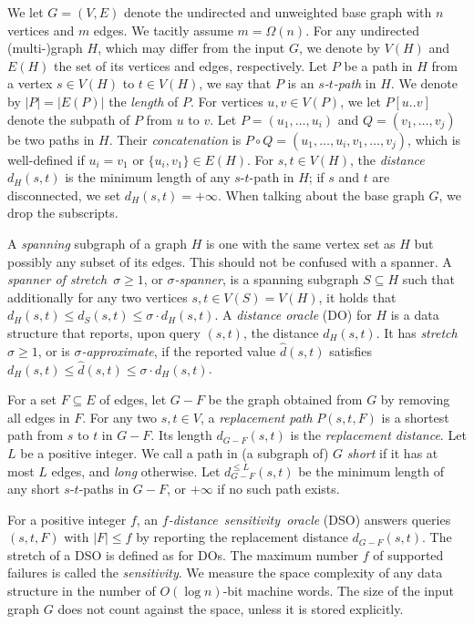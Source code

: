 \documentclass{theoretics}
\renewcommand{\le}{\leqslant}
\renewcommand{\ge}{\geqslant}
\begin{document}
We let $G = (V,E)$ denote the undirected and unweighted base graph with $n$ vertices and $m$ edges.
We tacitly assume $m = \Omega(n)$.
For any undirected \mbox{(multi-)graph} $H$, which may differ from the input $G$,
we denote by $V(H)$ and $E(H)$ the set of its vertices and edges, respectively.
Let $P$ be a path in $H$ from a vertex $s \in V(H)$ to $t \in V(H)$,
we say that $P$ is an \emph{$s$-$t$-path} in $H$. 
We denote by $|P| = |E(P)|$ the \emph{length} of $P$.
For vertices $u,v \in V(P)$, we let $P[u..v]$ denote the subpath of $P$ from $u$ to $v$.
Let $P = (u_1, \dots, u_i)$ and $Q = (v_1, \dots, v_j)$ be two paths in $H$.
Their \emph{concatenation} is $P \circ Q = (u_1, \dots, u_i, v_1, \dots, v_j)$,
which is well-defined if $u_i = v_1$ or $\{u_i,v_1\} \in E(H)$.
For $s,t \in V(H)$, the \emph{distance} $d_H(s,t)$ 
is the minimum length of any $s$-$t$-path in $H$;
if $s$ and $t$ are disconnected, we set $d_H(s,t) =+ \infty$.
When talking about the base graph $G$, we drop the subscripts.

A \emph{spanning} subgraph of a graph $H$
is one with the same vertex set as $H$ but possibly any subset of its edges.
This should not be confused with a spanner.
A \emph{spanner of stretch}~$\sigma \ge 1$, or \emph{$\sigma$-spanner},
is a spanning subgraph $S \subseteq H$
such that additionally for any two vertices $s,t \in V(S) = V(H)$, 
it holds that $d_H(s,t) \le d_S(s,t) \le \sigma \cdot d_H(s,t)$.
A \emph{distance oracle} (DO) for $H$ is a data structure 
that reports, upon query $(s,t)$, the distance $d_H(s,t)$.
It has \emph{stretch} $\sigma \ge 1$, or is $\sigma$\emph{-approximate},
if the reported value $\widehat{d}(s,t)$
satisfies $d_H(s,t) \le \widehat{d}(s,t) \le \sigma \cdot d_H(s,t)$.

For a set $F \subseteq E$ of edges,
let $G{-}F$ be the graph obtained from $G$ by removing all edges in $F$.
For any two $s,t \in V$, a \emph{replacement path} $P(s,t,F)$ 
is a shortest path from $s$ to $t$ in $G{-}F$. 
Its length $d_{G-F}(s,t)$ is the \emph{replacement distance}.
Let $L$ be a positive integer.
We call a path in (a subgraph of) $G$ \emph{short} if it has at most $L$ edges,
and \emph{long} otherwise.
Let $d_{G-F}^{\le L}(s,t)$ be the minimum length
of any short $s$-$t$-paths in $G-F$, or $+\infty$ if no such path exists.

For a positive integer $f$, an \mbox{\emph{$f$-distance sensitivity oracle}} (DSO)
answers queries $(s,t,F)$ with $|F| \le f$ by reporting the replacement distance $d_{G-F}(s,t)$.
The stretch of a DSO is defined as for DOs.
The maximum number $f$ of supported failures is called the \emph{sensitivity}.
We measure the space complexity of any data structure in the number of $O(\log n)$-bit machine words.
The size of the input graph $G$ does not count against the space, 
unless it is stored explicitly.
\end{document}
